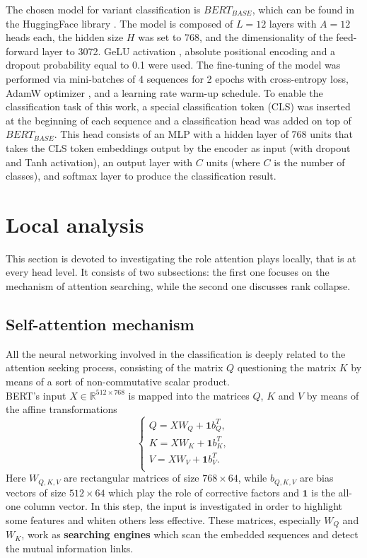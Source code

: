 \documentclass[11pt,a4paper,reqno]{amsart} %
\theoremstyle{definition}
\numberwithin{equation}{section}          %
\begin{document}
The chosen model for variant classification is $BERT_{BASE}$, which can be found in the HuggingFace library \cite{huggingface}. The model is composed of $L=12$ layers with $A=12$ heads each, the hidden size $H$ was set to 768, and the dimensionality of the feed-forward layer to 3072. GeLU activation \cite{DBLP:journals/corr/HendrycksG16}, absolute positional encoding and a dropout probability equal to 0.1 were used. The fine-tuning of the model was performed via mini-batches of 4 sequences for 2 epochs with cross-entropy loss, AdamW optimizer \cite{DBLP:journals/corr/abs-1711-05101}, and a learning rate warm-up schedule. To enable the classification task of this work, a special classification token (CLS) was inserted at the beginning of each sequence and a classification head was added on top of $BERT_{BASE}$. This head consists of an MLP with a hidden layer of 768 units that takes the CLS token embeddings output by the encoder as input (with dropout and Tanh activation), an output layer with $C$ units (where $C$ is the number of classes), and softmax layer to produce the classification result. 


\section{Local analysis} 

This section is devoted to investigating the role attention plays locally, that is at every head level. It consists of two subsections: the first one focuses on the mechanism of attention searching, while the second one discusses rank collapse.

\subsection{Self-attention mechanism}


All the neural networking involved in the classification is deeply related to the attention seeking process, consisting of the matrix $Q$ questioning the matrix $K$ by means of a sort of non-commutative scalar product. \\
BERT's input $X \in \mathbb{R}^{512 \times 768}$ is mapped into the matrices $Q$, $K$ and $V$ by means of the affine transformations
\begin{equation}
\begin{cases}
Q= X W_Q + \mathbf{1} b_Q^T,\\
K= X W_K + \mathbf{1}b_K^T,\\
V= X W_V + \mathbf{1}b_V^T.\\
\end{cases}
\end{equation}
Here $W_{Q,K,V}$ are rectangular matrices of size $768 \times 64$, while $b_{Q,K,V}$ are bias vectors of size $512 \times 64$ which play the role of corrective factors and $\mathbf{1}$ is the all-one column vector. In this step, the input is investigated in order to highlight some features and whiten others less effective. These matrices, especially $W_Q$ and $W_K$, work as \textbf{searching engines} which scan the embedded sequences and detect the mutual information links.
\end{document}
